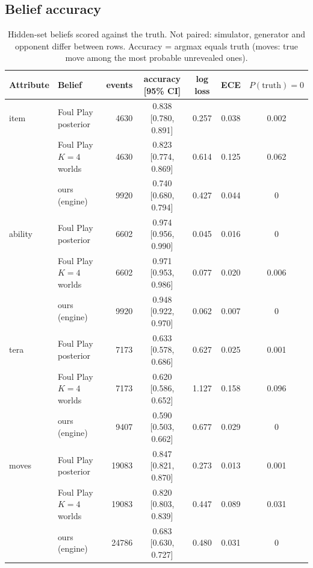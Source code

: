 \documentclass[10pt]{article}
\theoremstyle{plain}
\theoremstyle{definition}
\theoremstyle{remark}
\begin{document}
\subsection{Belief accuracy}\label{sec:belief}

\begin{table}[!htbp]\centering\small\setlength{\tabcolsep}{3.5pt}
\caption{Hidden-set beliefs scored against the truth. Not paired: simulator, generator and opponent differ between
rows. Accuracy = argmax equals truth (moves: true move among the most probable unrevealed ones).}\label{tab:belief}
\begin{tabular}{@{}llrcccc@{}}\toprule
Attribute & Belief & events & accuracy [95\% CI] & log loss & ECE & $P(\text{truth})=0$ \\ \midrule
item & Foul Play posterior & 4630 & 0.838 [0.780, 0.891] & 0.257 & 0.038 & 0.002 \\
 & Foul Play $K=4$ worlds & 4630 & 0.823 [0.774, 0.869] & 0.614 & 0.125 & 0.062 \\
 & ours (engine) & 9920 & 0.740 [0.680, 0.794] & 0.427 & 0.044 & 0 \\
ability & Foul Play posterior & 6602 & 0.974 [0.956, 0.990] & 0.045 & 0.016 & 0 \\
 & Foul Play $K=4$ worlds & 6602 & 0.971 [0.953, 0.986] & 0.077 & 0.020 & 0.006 \\
 & ours (engine) & 9920 & 0.948 [0.922, 0.970] & 0.062 & 0.007 & 0 \\
tera & Foul Play posterior & 7173 & 0.633 [0.578, 0.686] & 0.627 & 0.025 & 0.001 \\
 & Foul Play $K=4$ worlds & 7173 & 0.620 [0.586, 0.652] & 1.127 & 0.158 & 0.096 \\
 & ours (engine) & 9407 & 0.590 [0.503, 0.662] & 0.677 & 0.029 & 0 \\
moves & Foul Play posterior & 19083 & 0.847 [0.821, 0.870] & 0.273 & 0.013 & 0.001 \\
 & Foul Play $K=4$ worlds & 19083 & 0.820 [0.803, 0.839] & 0.447 & 0.089 & 0.031 \\
 & ours (engine) & 24786 & 0.683 [0.630, 0.727] & 0.480 & 0.031 & 0 \\ \bottomrule
\end{tabular}\end{table}
\end{document}
